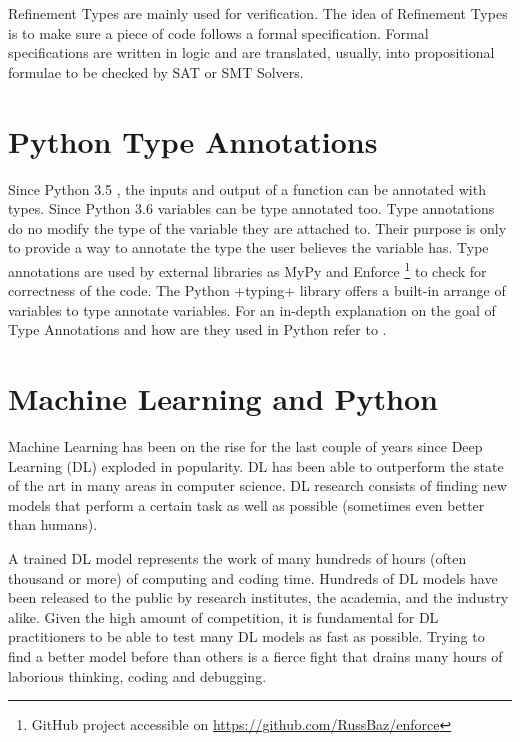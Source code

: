 Refinement Types \autocite{rushby_subtypes_1998} are mainly used for
verification. The idea of Refinement Types is to make sure a piece of
code follows a formal specification. Formal specifications are written
in logic and are translated, usually, into propositional formulae to be
checked by SAT or SMT Solvers.

\section{Python Type Annotations}\label{python-type-annotations}

Since Python 3.5 \autocite{pep484}, the inputs and output of a function can be annotated
with types. Since Python 3.6 \autocite{pep526} variables can be type annotated too. Type
annotations do no modify the type of the variable they are attached to. Their purpose is
only to provide a way to annotate the type the user believes the variable has. Type
annotations are used by external libraries as MyPy \autocite{lehtosalo2016mypy} and
Enforce \footnote{GitHub project accessible on \url{https://github.com/RussBaz/enforce}}
to check for correctness of the code. The Python \pycode+typing+ library offers a built-in
arrange of variables to type annotate variables. For an in-depth explanation on the goal
of Type Annotations and how are they used in Python refer to \textcite{pep483}.

\section{Machine Learning and Python}%
\label{machine-learning-and-python}

Machine Learning has been on the rise for the last couple of years since
Deep Learning (DL) exploded in popularity. DL has been able to
outperform the state of the art in many areas in computer science. DL
research consists of finding new models that perform a certain task as
well as possible (sometimes even better than humans).

A trained DL model represents the work of many hundreds of hours (often
thousand or more) of computing and coding time. Hundreds of DL models
have been released to the public by research institutes, the academia,
and the industry alike. Given the high amount of competition, it is
fundamental for DL practitioners to be able to test many DL models as
fast as possible. Trying to find a better model before than others is a
fierce fight that drains many hours of laborious thinking, coding and
debugging.

